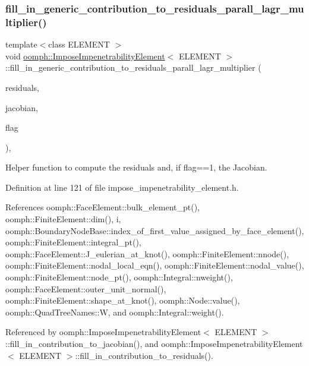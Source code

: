 \subsubsection{\texorpdfstring{fill\+\_\+in\+\_\+generic\+\_\+contribution\+\_\+to\+\_\+residuals\+\_\+parall\+\_\+lagr\+\_\+multiplier()}{fill\_in\_generic\_contribution\_to\_residuals\_parall\_lagr\_multiplier()}}
{\footnotesize\ttfamily template$<$class E\+L\+E\+M\+E\+NT $>$ \\
void \hyperlink{classoomph_1_1ImposeImpenetrabilityElement}{oomph\+::\+Impose\+Impenetrability\+Element}$<$ E\+L\+E\+M\+E\+NT $>$\+::fill\+\_\+in\+\_\+generic\+\_\+contribution\+\_\+to\+\_\+residuals\+\_\+parall\+\_\+lagr\+\_\+multiplier (\begin{DoxyParamCaption}\item[{\hyperlink{classoomph_1_1Vector}{Vector}$<$ double $>$ \&}]{residuals,  }\item[{\hyperlink{classoomph_1_1DenseMatrix}{Dense\+Matrix}$<$ double $>$ \&}]{jacobian,  }\item[{const unsigned \&}]{flag }\end{DoxyParamCaption})\hspace{0.3cm}{\ttfamily [inline]}, {\ttfamily [protected]}}



Helper function to compute the residuals and, if flag==1, the Jacobian. 



Definition at line 121 of file impose\+\_\+impenetrability\+\_\+element.\+h.



References oomph\+::\+Face\+Element\+::bulk\+\_\+element\+\_\+pt(), oomph\+::\+Finite\+Element\+::dim(), i, oomph\+::\+Boundary\+Node\+Base\+::index\+\_\+of\+\_\+first\+\_\+value\+\_\+assigned\+\_\+by\+\_\+face\+\_\+element(), oomph\+::\+Finite\+Element\+::integral\+\_\+pt(), oomph\+::\+Face\+Element\+::\+J\+\_\+eulerian\+\_\+at\+\_\+knot(), oomph\+::\+Finite\+Element\+::nnode(), oomph\+::\+Finite\+Element\+::nodal\+\_\+local\+\_\+eqn(), oomph\+::\+Finite\+Element\+::nodal\+\_\+value(), oomph\+::\+Finite\+Element\+::node\+\_\+pt(), oomph\+::\+Integral\+::nweight(), oomph\+::\+Face\+Element\+::outer\+\_\+unit\+\_\+normal(), oomph\+::\+Finite\+Element\+::shape\+\_\+at\+\_\+knot(), oomph\+::\+Node\+::value(), oomph\+::\+Quad\+Tree\+Names\+::W, and oomph\+::\+Integral\+::weight().



Referenced by oomph\+::\+Impose\+Impenetrability\+Element$<$ E\+L\+E\+M\+E\+N\+T $>$\+::fill\+\_\+in\+\_\+contribution\+\_\+to\+\_\+jacobian(), and oomph\+::\+Impose\+Impenetrability\+Element$<$ E\+L\+E\+M\+E\+N\+T $>$\+::fill\+\_\+in\+\_\+contribution\+\_\+to\+\_\+residuals().

